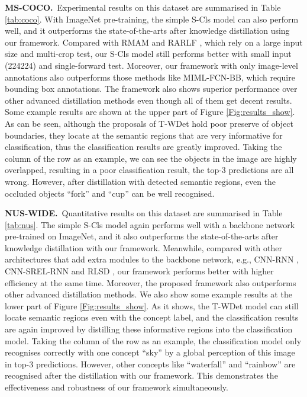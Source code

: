 \documentclass[sigconf,natbib=false]{acmart}
\begin{document}
\noindent \textbf{MS-COCO.}\ Experimental results on this dataset are summarised in Table \ref{tab:coco}. With ImageNet pre-training, the simple S-Cls model can also perform well, and it outperforms the state-of-the-arts after knowledge distillation using our framework. Compared with RMAM \cite{MLIC7_iccv17_ZTGRL} and RARLF \cite{MLIC17_aaai18_TZGL}, which rely on a large input size and multi-crop test, our S-Cls model still performs better with small input (224224) and single-forward test. Moreover, our framework with only image-level annotations also outperforms those methods like MIML-FCN-BB, which require bounding box annotations. The framework also shows superior performance over other advanced distillation methods even though all of them get decent results. Some example results are shown at the upper part of Figure \ref{Fig:results_show}. As can be seen, although the proposals of T-WDet hold poor preserve of object boundaries, they locate at the semantic regions that are very informative for classification, thus the classification results are greatly improved. Taking the  column of the  row as an example, we can see the objects in the image are highly overlapped, resulting in a poor classification result, the top-3 predictions are all wrong. However, after distillation with detected semantic regions, even the occluded objects ``fork'' and ``cup'' can be well recognised.

\vspace{+1mm}
\noindent \textbf{NUS-WIDE.}\ Quantitative results on this dataset are summarised in Table \ref{tab:nus}. The simple S-Cls model again performs well with a backbone network pre-trained on ImageNet, and it also outperforms the state-of-the-arts after knowledge distillation with our framework. Meanwhile, compared with other architectures that add extra modules to the backbone network, e.g., CNN-RNN \cite{MLIC6_cvpr16_JYJZCW},  CNN-SREL-RNN \cite{MLIC3_cvpr17_FTTWC} and RLSD \cite{MLIC22_tmm18_jqjcj}, our framework performs better with higher efficiency at the same time. Moreover, the proposed framework also outperforms other advanced distillation methods. We also show some example results at the lower part of Figure \ref{Fig:results_show}. As it shows, the T-WDet model can still locate semantic regions even with the concept label, and the classification results are again improved by distilling these informative regions into the classification model. Taking the  column of the  row as an example, the classification model only recognises correctly with one concept ``sky'' by a global perception of this image in top-3 predictions. However, other concepts like ``waterfall'' and ``rainbow'' are recognised after the distillation with our framework. This demonstrates the effectiveness and robustness of our framework simultaneously.
\end{document}
